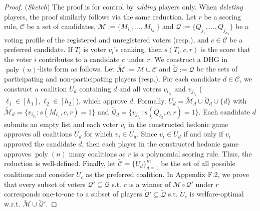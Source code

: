 \documentclass[letterpaper]{article} %
\DeclareMathOperator*{\poly}{poly}
\begin{document}
\begin{proof}
(\textit{Sketch})
The proof is for control by \textit{adding} players only. When \textit{deleting} players, the proof similarly follows via the same reduction. Let $r$ be a scoring rule, $\mathcal{C}$ be a set of candidates, $\mathcal{M} := \{M_{i_1}, \dots, M_{i_{h_1}}\}$ and $\mathcal{Q} := \{Q_{j_1}, \dots, Q_{j_{h_2}}\}$ be a voting profile of the registered and unregistered voters (resp.), and $c \in \mathcal{C}$ be a preferred candidate. If $T_i$ is voter $v_i$'s ranking, then $s(T_i, c, r)$ is the score that the voter $i$ contributes to a candidate $c$ under $r$. We construct a DHG in $\poly(n)$-lists form as follows. Let $\tilde{\mathcal{M}} := \mathcal{M} \cup \mathcal{C}$ and $\tilde{\mathcal{Q}} := \mathcal{Q}$ be the sets of participating and non-participating players (resp.). For each candidate $d \in \mathcal{C}$, we construct a coalition $U_d$ containing $d$ and all voters $v_{i_{\ell_1}}$ and $v_{j_{\ell_2}}$ ($\ell_1 \in [h_1], \ell_2 \in [h_2]$), which approve $d$. Formally, $U_d = \tilde{\mathcal{M}}_d \cup \tilde{\mathcal{Q}}_d \cup \{d\}$ with $\tilde{\mathcal{M}}_d = \{v_{i_{\ell_1}} : s(M_{\ell_1}, c, r) = 1 \}$ and $\tilde{\mathcal{Q}}_d = \{v_{j_{\ell_2}} : s(Q_{\ell_2}, c, r) = 1\}$. Each candidate $d$ submits an empty list and each voter $v_i$ in the constructed hedonic game approves all coalitions $U_d$ for which $v_i \in U_d$. Since $v_i \in U_d$ if and only if $v_i$ approved the candidate $d$, then each player in the constructed hedonic game approves $\poly(n)$ many coalitions as $r$ is a polynomial scoring rule. Thus, the reduction is well-defined. Finally, let $\tilde{\mathcal{C}} = \{U_d\}_{d=1}^m$ be the set of all possible coalitions and consider $U_c$ as the preferred coalition. In Appendix F.2, we prove that every subset of voters $\mathcal{Q}' \subseteq \mathcal{Q}$ s.t. $c$ is a winner of $\mathcal{M} \circ \mathcal{Q}'$ under $r$ corresponds one-to-one to a subset of players $\tilde{\mathcal{Q}}' \subseteq \tilde{\mathcal{Q}}$ s.t. $U_c$ is welfare-optimal w.r.t. $\tilde{\mathcal{M}} \cup \tilde{\mathcal{Q}}'$.
\end{proof}
\end{document}
